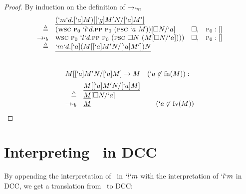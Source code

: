 \begin{proof}{By induction on the definition of $\rightarrow_{`m}$}
\[\begin{array}{rlrl}
               & \tr{(`m`d.[`a]M)[[`g]M^\prime N/[`a]M^\prime]}\\
    \triangleq & (\wsc\ \gp\ `l`d.\pp\ \gp\ (\psc\ `a\ M))[\square N/`a]         & \square, & \gp:[]  \\
    \tob\      & \wsc\ \gp\ `l`d.\pp\ \gp\ (\psc\ \square N\ (M[\square N/`a]))) & \square, & \gp:[]  \\
    \triangleq & \tr{`m`d.[`a](M[[`a]M^\prime N/[`a]M^\prime])N}
\end{array}
\]
\\ 
\[
\begin{array}{rlrl}
  \prooflabel{M[[`a]M^\prime N/[`a]M] \to M \hspace{10pt} (`a \not\in \fn(M)):} \\
               & \tr{M[[`a]M^\prime N/[`a]M]} \\
    \triangleq & \tr{M}[\square N/`a] \\
    \tob\      & \tr{M} & (`a \not\in \fv(M))
\end{array}
\]
\end{proof}

\section{Interpreting \ltry\ in DCC}

  By appending the interpretation of \ltry\ in $`l`m$ with the interpretation of
  $`l`m$ in DCC, we get a translation from \ltry\ to DCC:

 
